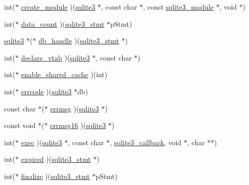 \begin{DoxyCompactItemize}
\item 
int($\ast$ \hyperlink{structsqlite3__api__routines_ab2793fe92f6ecd986d036e43915f0c5b}{create\+\_\+module} )(\hyperlink{structsqlite3}{sqlite3} $\ast$, const char $\ast$, const \hyperlink{structsqlite3__module}{sqlite3\+\_\+module} $\ast$, void $\ast$)
\item 
int($\ast$ \hyperlink{structsqlite3__api__routines_af251752525fef010bd8d98fd5af26aa3}{data\+\_\+count} )(\hyperlink{sqlite3_8c_af2a033da1327cdd77f0a174a09aedd0c}{sqlite3\+\_\+stmt} $\ast$p\+Stmt)
\item 
\hyperlink{structsqlite3}{sqlite3} $\ast$($\ast$ \hyperlink{structsqlite3__api__routines_aac07d5898204bc18ddf5b45cc52c3062}{db\+\_\+handle} )(\hyperlink{sqlite3_8c_af2a033da1327cdd77f0a174a09aedd0c}{sqlite3\+\_\+stmt} $\ast$)
\item 
int($\ast$ \hyperlink{structsqlite3__api__routines_ab96c11c4adf08d1f0bdcff2cb643796e}{declare\+\_\+vtab} )(\hyperlink{structsqlite3}{sqlite3} $\ast$, const char $\ast$)
\item 
int($\ast$ \hyperlink{structsqlite3__api__routines_a59467cfa1e3c74205cea906d16629647}{enable\+\_\+shared\+\_\+cache} )(int)
\item 
int($\ast$ \hyperlink{structsqlite3__api__routines_a9cf1e23a3f17f5fdafb327194466cc80}{errcode} )(\hyperlink{structsqlite3}{sqlite3} $\ast$db)
\item 
const char $\ast$($\ast$ \hyperlink{structsqlite3__api__routines_aa8406d8ac4fb37fa9772c0ea1293c4c0}{errmsg} )(\hyperlink{structsqlite3}{sqlite3} $\ast$)
\item 
const void $\ast$($\ast$ \hyperlink{structsqlite3__api__routines_a819557ae1f065e16705e927ed1c8544b}{errmsg16} )(\hyperlink{structsqlite3}{sqlite3} $\ast$)
\item 
int($\ast$ \hyperlink{structsqlite3__api__routines_ac07c98ed980b0f1f7f1c1b6c95390f66}{exec} )(\hyperlink{structsqlite3}{sqlite3} $\ast$, const char $\ast$, \hyperlink{sqlite3_8h_aede337a366367e94a52d849482967ddd}{sqlite3\+\_\+callback}, void $\ast$, char $\ast$$\ast$)
\item 
int($\ast$ \hyperlink{structsqlite3__api__routines_a9c5e16f9d478ad089c7ddb2320ce52e9}{expired} )(\hyperlink{sqlite3_8c_af2a033da1327cdd77f0a174a09aedd0c}{sqlite3\+\_\+stmt} $\ast$)
\item 
int($\ast$ \hyperlink{structsqlite3__api__routines_adf6d460eae9a5dd4edef98a6f0bcfabb}{finalize} )(\hyperlink{sqlite3_8c_af2a033da1327cdd77f0a174a09aedd0c}{sqlite3\+\_\+stmt} $\ast$p\+Stmt)
\item 
$$
\end{DoxyCompactItemize}
